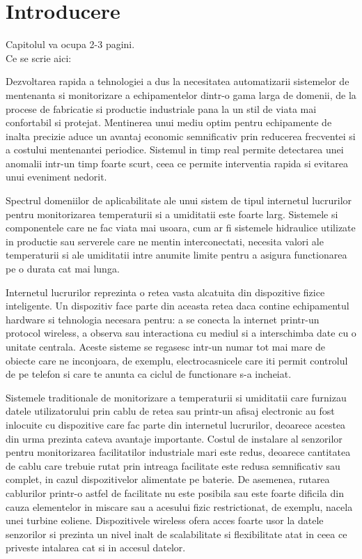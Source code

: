 \chapter{Introducere}\label{ch:intro}
\pagestyle{fancy}

{\color{blue}\noindent Capitolul va ocupa 2-3 pagini.\\}
\noindent Ce se scrie aici:

Dezvoltarea rapida a tehnologiei a dus la necesitatea automatizarii sistemelor de mentenanta si monitorizare a echipamentelor dintr-o gama larga de 
domenii, de la procese de fabricatie si productie industriale pana la un stil de viata mai confortabil si protejat. Mentinerea unui mediu optim pentru
echipamente de inalta precizie aduce un avantaj economic semnificativ prin reducerea frecventei si a costului mentenantei periodice. Sistemul in timp
real permite detectarea unei anomalii intr-un timp foarte scurt, ceea ce permite interventia rapida si evitarea unui eveniment nedorit.

Spectrul domeniilor de aplicabilitate ale unui sistem de tipul internetul lucrurilor pentru monitorizarea temperaturii si a umiditatii este foarte 
larg. Sistemele si componentele care ne fac viata mai usoara, cum ar fi sistemele hidraulice utilizate in productie sau serverele care ne mentin 
interconectati, necesita valori ale temperaturii si ale umiditatii intre anumite limite pentru a asigura functionarea pe o durata cat mai lunga.

Internetul lucrurilor reprezinta o retea vasta alcatuita din dispozitive fizice inteligente. Un dispozitiv face parte din aceasta retea daca contine
echipamentul hardware si tehnologia necesara pentru: a se conecta la internet printr-un protocol wireless, a observa sau interactiona cu mediul si
a interschimba date cu o unitate centrala. Aceste sisteme se regasesc intr-un numar tot mai mare de obiecte care ne inconjoara, de exemplu,
electrocasnicele care iti permit controlul de pe telefon si care te anunta ca ciclul de functionare s-a incheiat.

Sistemele traditionale de monitorizare a temperaturii si umiditatii care furnizau datele utilizatorului prin cablu de retea sau printr-un afisaj
electronic au fost inlocuite cu dispozitive care fac parte din internetul lucrurilor, deoarece acestea din urma prezinta cateva avantaje importante.
Costul de instalare al senzorilor pentru monitorizarea facilitatilor industriale mari este redus, deoarece cantitatea de cablu care trebuie
rutat prin intreaga facilitate este redusa semnificativ sau complet, in cazul dispozitivelor alimentate pe baterie. De asemenea, rutarea cablurilor 
printr-o astfel de facilitate nu este posibila sau este foarte dificila din cauza elementelor in miscare sau a acesului fizic restrictionat, de exemplu,
nacela unei turbine eoliene. Dispozitivele wireless ofera acces foarte usor la datele senzorilor si prezinta un nivel inalt de scalabilitate si 
flexibilitate atat in ceea ce priveste intalarea cat si in accesul datelor.

